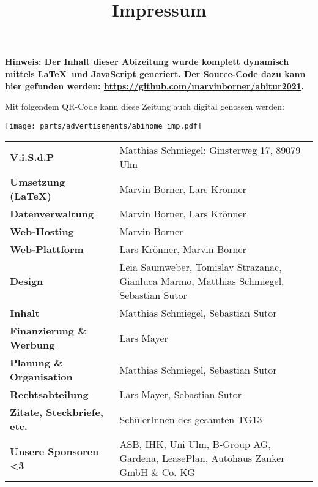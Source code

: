 \clearpage
\title{Impressum}

\fancyhf{}
\fancyhead[L]{\hspace*{1cm}\vspace*{0cm}{\cartamarina\Huge{\rightmark}}}


\textbf{Hinweis: Der Inhalt dieser Abizeitung wurde komplett dynamisch mittels \LaTeX\  und JavaScript generiert. Der Source-Code dazu kann hier gefunden werden: \url{https://github.com/marvinborner/abitur2021}.}

Mit folgendem QR-Code kann diese Zeitung auch digital genossen werden:

\begin{center}
\end{center}

\texttt{[image: parts/advertisements/abihome\_imp.pdf]}

\begin{table}[b]
	\begin{tabular}{ l l }
		\textbf{V.i.S.d.P}                 & Matthias Schmiegel: Ginsterweg 17, 89079 Ulm                                            \\
		\textbf{Umsetzung (\LaTeX)}        & Marvin Borner, Lars Krönner                                                             \\
		\textbf{Datenverwaltung}           & Marvin Borner, Lars Krönner                                                             \\
		\textbf{Web-Hosting}               & Marvin Borner                                                                           \\
		\textbf{Web-Plattform}             & Lars Krönner, Marvin Borner                                                             \\
		\textbf{Design}                    & Leia Saumweber, Tomislav Strazanac, Gianluca Marmo, Matthias Schmiegel, Sebastian Sutor \\
		\textbf{Inhalt}                    & Matthias Schmiegel, Sebastian Sutor                                                     \\
		\textbf{Finanzierung \& Werbung}   & Lars Mayer                                                                              \\
		\textbf{Planung \& Organisation}   & Matthias Schmiegel, Sebastian Sutor                                                     \\
		\textbf{Rechtsabteilung}           & Lars Mayer, Sebastian Sutor                                                             \\
		\textbf{Zitate, Steckbriefe, etc.} & SchülerInnen des gesamten TG13                                                          \\
		\textbf{Unsere Sponsoren <3}       & ASB, IHK, Uni Ulm, B-Group AG, Gardena, LeasePlan, Autohaus Zanker GmbH \& Co. KG
	\end{tabular}
\end{table}
